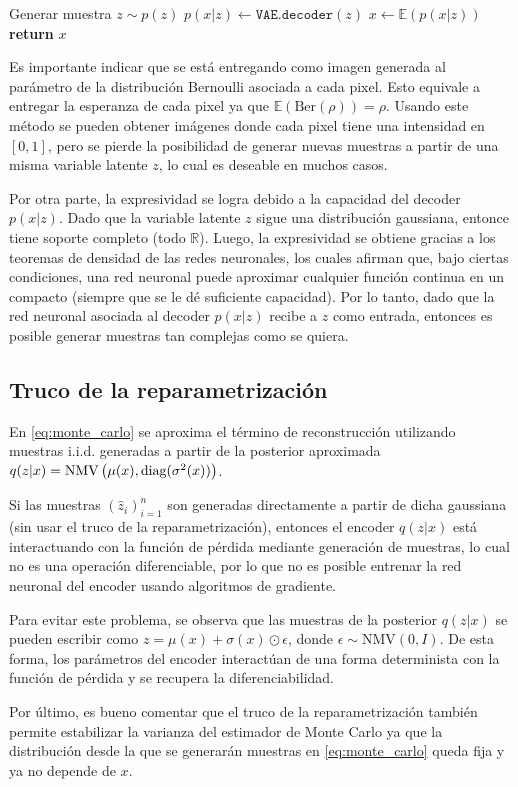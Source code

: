 \documentclass{article}
\begin{document}
\begin{algorithm}
	\caption{Generar una muestra en un VAE}
	\label{alg:sampling}
	\begin{algorithmic}[1]
		\State Generar muestra $z \sim p(z)$  
		\State $p(x|z) \gets \texttt{VAE.decoder}(z)$  
		\State $x \gets \mathbb{E}(p(x|z))$  
		\State \textbf{return} $x$
	\EndProcedure
	\end{algorithmic}
\end{algorithm}

Es importante indicar que se está entregando como imagen generada al parámetro de la distribución Bernoulli asociada a cada pixel. Esto equivale a entregar la esperanza de cada pixel ya que $\mathbb{E}(\text{Ber}(\rho))=\rho$. Usando este método se pueden obtener imágenes donde cada pixel tiene una intensidad en $[0,1]$, pero se pierde la posibilidad de generar nuevas muestras a partir de una misma variable latente $z$, lo cual es deseable en muchos casos.

Por otra parte, la expresividad se logra debido a la capacidad del decoder $p(x|z)$. Dado que la variable latente $z$ sigue una distribución gaussiana, entonce tiene soporte completo (todo $\mathbb{R}$). Luego, la expresividad se obtiene gracias a los teoremas de densidad de las redes neuronales, los cuales afirman que, bajo ciertas condiciones, una red neuronal puede aproximar cualquier función continua en un compacto (siempre que se le dé suficiente capacidad). Por lo tanto, dado que la red neuronal asociada al decoder $p(x|z)$ recibe a $z$ como entrada, entonces es posible generar muestras tan complejas como se quiera.

\subsection{Truco de la reparametrización}

En \eqref{eq:monte_carlo} se aproxima el término de reconstrucción utilizando muestras i.i.d. generadas a partir de la posterior aproximada $q(z|x)=\text{NMV}\left(\mu(x),\text{diag}(\sigma^2(x))\right)$.

Si las muestras $(\hat{z}_i)_{i=1}^n$ son generadas directamente a partir de dicha gaussiana (sin usar el truco de la reparametrización), entonces el encoder $q(z|x)$ está interactuando con la función de pérdida mediante generación de muestras, lo cual no es una operación diferenciable, por lo que no es posible entrenar la red neuronal del encoder usando algoritmos de gradiente.

Para evitar este problema, se observa que las muestras de la posterior $q(z|x)$ se pueden escribir como $z = \mu(x) + \sigma(x)\odot\epsilon$, donde $\epsilon\sim\text{NMV}\left(0,I\right)$. De esta forma, los parámetros del encoder interactúan de una forma determinista con la función de pérdida y se recupera la diferenciabilidad.

Por último, es bueno comentar que el truco de la reparametrización también permite estabilizar la varianza del estimador de Monte Carlo ya que la distribución desde la que se generarán muestras en \eqref{eq:monte_carlo} queda fija y ya no depende de $x$.
\end{document}

